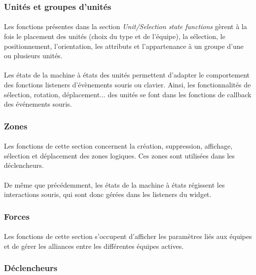 \documentclass[a4paper]{article}
\begin{document}
\subsubsection{Unités et groupes d'unités}
\paragraph{}
Les fonctions présentes dans la section \textit{Unit/Selection state functions} gèrent à la  fois le placement des unités (choix du type et de l'équipe), la sélection, le positionnement, l'orientation, les attributs et l'appartenance à un groupe d'une ou plusieurs unités.
\paragraph{} Les états de la machine à états des unités permettent d'adapter le comportement des fonctions listeners d'évènements souris ou clavier. Ainsi, les fonctionnalités de sélection, rotation, déplacement... des unités se font dans les fonctions de callback des événements souris.
\subsubsection{Zones}
\paragraph{}
Les fonctions de cette section concernent la création, suppression, affichage, sélection et déplacement des zones logiques. Ces zones sont utilisées dans les déclencheurs.
\paragraph{}
De même que précédemment, les états de la machine à états régissent les interactions souris, qui sont donc gérées dans les listeners du widget.
\subsubsection{Forces}
\paragraph{}
Les fonctions de cette section s'occupent d'afficher les paramètres liés aux équipes et de gérer les alliances entre les différentes équipes actives.
\subsubsection{Déclencheurs}
\end{document}

